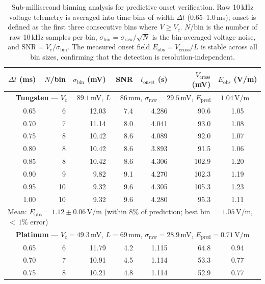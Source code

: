 \setcounter{table}{1}
\begin{table}[ht]
\caption{Sub-millisecond binning analysis for predictive onset verification.
Raw 10\,kHz voltage telemetry is averaged into time bins of width $\Delta t$
(0.65--1.0\,ms); onset is defined as the first three consecutive bins
where $V \geq V_c$. $N$/bin is the number of raw 10\,kHz samples per bin,
$\sigma_{\mathrm{bin}} = \sigma_{\mathrm{raw}}/\!\sqrt{N}$ is the
bin-averaged voltage noise, and
$\mathrm{SNR} = V_c / \sigma_{\mathrm{bin}}$.
The measured onset field $E_{\mathrm{obs}} = V_{\mathrm{cross}}/L$ is
stable across all bin sizes, confirming that the detection is
resolution-independent.}
\label{tab:binning}
\begin{ruledtabular}
\begin{tabular}{rrrrrrc}
$\Delta t$ (ms) & $N$/bin & $\sigma_{\mathrm{bin}}$ (mV) & SNR &
$t_{\mathrm{onset}}$ (s) & $V_{\mathrm{cross}}$ (mV) & $E_{\mathrm{obs}}$ (V/m) \\
\hline
\multicolumn{7}{c}{\textbf{Tungsten} --- $V_c = 89.1$\,mV, $L = 86$\,mm,
$\sigma_{\mathrm{raw}} = 29.5$\,mV, $E_{\mathrm{pred}} = 1.04$\,V/m} \\
\hline
0.65 &  6 & 12.03 &  7.4 & 4.286 &  90.6 & 1.05 \\
0.70 &  7 & 11.14 &  8.0 & 4.041 &  93.0 & 1.08 \\
0.75 &  8 & 10.42 &  8.6 & 4.089 &  92.0 & 1.07 \\
0.80 &  8 & 10.42 &  8.6 & 3.893 &  91.5 & 1.06 \\
0.85 &  8 & 10.42 &  8.6 & 4.306 & 102.9 & 1.20 \\
0.90 &  9 &  9.82 &  9.1 & 4.270 & 102.3 & 1.19 \\
0.95 & 10 &  9.32 &  9.6 & 4.305 & 105.3 & 1.23 \\
1.00 & 10 &  9.32 &  9.6 & 4.280 &  95.3 & 1.11 \\
\hline
\multicolumn{7}{l}{Mean: $E_{\mathrm{obs}} = 1.12 \pm 0.06$\,V/m
\quad (within $8\%$ of prediction; best bin $= 1.05$\,V/m, ${<}\,1\%$ error)} \\
\hline
\hline
\multicolumn{7}{c}{\textbf{Platinum} --- $V_c = 49.3$\,mV, $L = 69$\,mm,
$\sigma_{\mathrm{raw}} = 28.9$\,mV, $E_{\mathrm{pred}} = 0.71$\,V/m} \\
\hline
0.65 &  6 & 11.79 &  4.2 & 1.115 &  64.8 & 0.94 \\
0.70 &  7 & 10.91 &  4.5 & 1.114 &  53.3 & 0.77 \\
0.75 &  8 & 10.21 &  4.8 & 1.114 &  52.9 & 0.77 \\

\end{tabular}
\end{ruledtabular}
\end{table}
